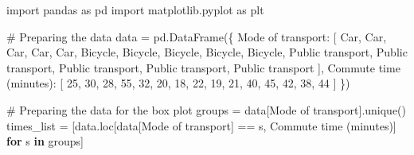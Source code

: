 \documentclass[
  english,
  letterpaper,
  DIV=11,
  numbers=noendperiod]{scrreprt}
\newenvironment{Shaded}{\begin{snugshade}}{\end{snugshade}}
\newcommand{\CommentTok}[1]{\textcolor[rgb]{0.37,0.37,0.37}{#1}}
\newcommand{\ControlFlowTok}[1]{\textcolor[rgb]{0.00,0.23,0.31}{\textbf{#1}}}
\newcommand{\DecValTok}[1]{\textcolor[rgb]{0.68,0.00,0.00}{#1}}
\newcommand{\ImportTok}[1]{\textcolor[rgb]{0.00,0.46,0.62}{#1}}
\newcommand{\KeywordTok}[1]{\textcolor[rgb]{0.00,0.23,0.31}{\textbf{#1}}}
\newcommand{\NormalTok}[1]{\textcolor[rgb]{0.00,0.23,0.31}{#1}}
\newcommand{\OperatorTok}[1]{\textcolor[rgb]{0.37,0.37,0.37}{#1}}
\newcommand{\StringTok}[1]{\textcolor[rgb]{0.13,0.47,0.30}{#1}}
\begin{document}
\begin{Shaded}
\begin{Highlighting}[]
\ImportTok{import}\NormalTok{ pandas }\ImportTok{as}\NormalTok{ pd}
\ImportTok{import}\NormalTok{ matplotlib.pyplot }\ImportTok{as}\NormalTok{ plt}

\CommentTok{\# Preparing the data}
\NormalTok{data }\OperatorTok{=}\NormalTok{ pd.DataFrame(\{}
    \StringTok{\textquotesingle{}Mode of transport\textquotesingle{}}\NormalTok{: [}
        \StringTok{\textquotesingle{}Car\textquotesingle{}}\NormalTok{, }\StringTok{\textquotesingle{}Car\textquotesingle{}}\NormalTok{, }\StringTok{\textquotesingle{}Car\textquotesingle{}}\NormalTok{, }\StringTok{\textquotesingle{}Car\textquotesingle{}}\NormalTok{, }\StringTok{\textquotesingle{}Car\textquotesingle{}}\NormalTok{,}
        \StringTok{\textquotesingle{}Bicycle\textquotesingle{}}\NormalTok{,    }\StringTok{\textquotesingle{}Bicycle\textquotesingle{}}\NormalTok{,    }\StringTok{\textquotesingle{}Bicycle\textquotesingle{}}\NormalTok{,    }\StringTok{\textquotesingle{}Bicycle\textquotesingle{}}\NormalTok{,    }\StringTok{\textquotesingle{}Bicycle\textquotesingle{}}\NormalTok{,}
        \StringTok{\textquotesingle{}Public transport\textquotesingle{}}\NormalTok{, }\StringTok{\textquotesingle{}Public transport\textquotesingle{}}\NormalTok{, }\StringTok{\textquotesingle{}Public transport\textquotesingle{}}\NormalTok{, }\StringTok{\textquotesingle{}Public transport\textquotesingle{}}\NormalTok{, }\StringTok{\textquotesingle{}Public transport\textquotesingle{}}
\NormalTok{    ],}
    \StringTok{\textquotesingle{}Commute time (minutes)\textquotesingle{}}\NormalTok{: [}
        \DecValTok{25}\NormalTok{, }\DecValTok{30}\NormalTok{, }\DecValTok{28}\NormalTok{, }\DecValTok{55}\NormalTok{, }\DecValTok{32}\NormalTok{,}
        \DecValTok{20}\NormalTok{, }\DecValTok{18}\NormalTok{, }\DecValTok{22}\NormalTok{, }\DecValTok{19}\NormalTok{, }\DecValTok{21}\NormalTok{,}
        \DecValTok{40}\NormalTok{, }\DecValTok{45}\NormalTok{, }\DecValTok{42}\NormalTok{, }\DecValTok{38}\NormalTok{, }\DecValTok{44}
\NormalTok{    ]}
\NormalTok{\})}

\CommentTok{\# Preparing the data for the box plot}
\NormalTok{groups }\OperatorTok{=}\NormalTok{ data[}\StringTok{\textquotesingle{}Mode of transport\textquotesingle{}}\NormalTok{].unique()}
\NormalTok{times\_list }\OperatorTok{=}\NormalTok{ [data.loc[data[}\StringTok{\textquotesingle{}Mode of transport\textquotesingle{}}\NormalTok{] }\OperatorTok{==}\NormalTok{ s, }\StringTok{\textquotesingle{}Commute time (minutes)\textquotesingle{}}\NormalTok{]}
              \ControlFlowTok{for}\NormalTok{ s }\KeywordTok{in}\NormalTok{ groups]}


\end{Highlighting}
\end{Shaded}
\end{document}
